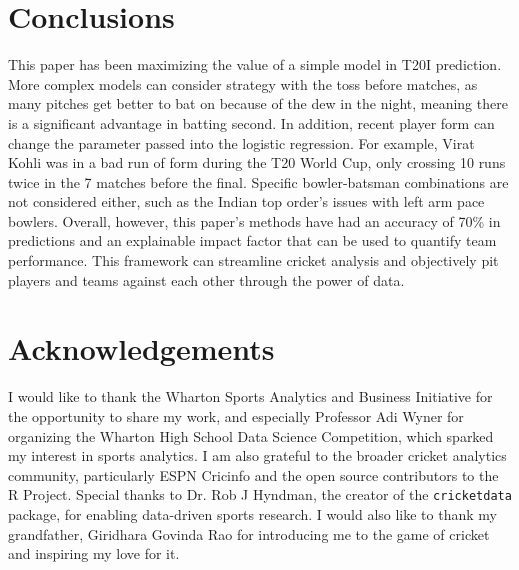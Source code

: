 \documentclass{article}[12pt]
\begin{document}
\section{Conclusions}

This paper has been maximizing the value of a simple model in T20I prediction. More complex models can consider strategy with the toss before matches, as many pitches get better to bat on because of the dew in the night, meaning there is a significant advantage in batting second. \parencite{krishnaswamy_2022_the} In addition, recent player form can change the parameter passed into the logistic regression. For example, Virat Kohli was in a bad run of form during the T20 World Cup, only crossing 10 runs twice in the 7 matches before the final. Specific bowler-batsman combinations are not considered either, such as the Indian top order's issues with left arm pace bowlers.\parencite{iyer_2023_why} Overall, however, this paper's methods have had an accuracy of 70\% in predictions and an explainable impact factor that can be used to quantify team performance. This framework can streamline cricket analysis and objectively pit players and teams against each other through the power of data.

\section{Acknowledgements}

I would like to thank the Wharton Sports Analytics and Business Initiative for the opportunity to share my work, and especially Professor Adi Wyner for organizing the Wharton High School Data Science Competition, which sparked my interest in sports analytics. I am also grateful to the broader cricket analytics community, particularly ESPN Cricinfo and the open source contributors to the R Project. Special thanks to Dr. Rob J Hyndman, the creator of the \texttt{cricketdata} package, for enabling data-driven sports research. I would also like to thank my grandfather, Giridhara Govinda Rao for introducing me to the game of cricket and inspiring my love for it.









\clearpage
{}

\printbibliography
\pagebreak
\end{document}
